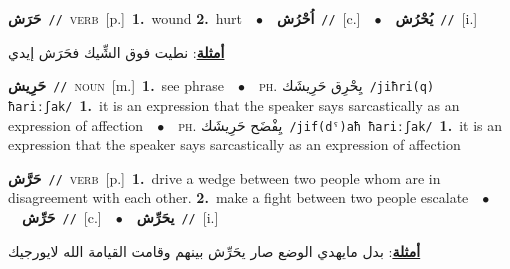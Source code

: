 \documentclass[10pt,a4paper,twoside]{article} %
\begin{document}
\begin{multicols}{2}
{\setlength\topsep{0pt}\textbf{\foreignlanguage{arabic}{حَرَش}}\ {\color{gray}\texttt{//}\color{black}}\ \textsc{verb}\ [p.]\ \textbf{1.}~wound  \textbf{2.}~hurt\ \ $\bullet$\ \ \setlength\topsep{0pt}\textbf{\foreignlanguage{arabic}{اُحْرُش}}\ {\color{gray}\texttt{//}\color{black}}\ [c.]\ \ $\bullet$\ \ \setlength\topsep{0pt}\textbf{\foreignlanguage{arabic}{يُحْرُش}}\ {\color{gray}\texttt{//}\color{black}}\ [i.]\  \begin{flushright}\color{gray}\foreignlanguage{arabic}{\textbf{\underline{\foreignlanguage{arabic}{أمثلة}}}: نطيت فوق الشِّيك فحَرَش إيدي}\end{flushright}\color{black}} \vspace{2mm}

{\setlength\topsep{0pt}\textbf{\foreignlanguage{arabic}{حَرِيش}}\ {\color{gray}\texttt{//}\color{black}}\ \textsc{noun}\ [m.]\ \textbf{1.}~see phrase\ \ $\bullet$\ \ \textsc{ph.} \color{gray} \foreignlanguage{arabic}{يِحْرِق حَرِيشَك}\color{black}\ {\color{gray}\texttt{/{\sffamily jiħri(q) ħariːʃak}/}\color{black}}\ \textbf{1.}~it is an expression that the speaker says sarcastically as an expression of affection\ \ $\bullet$\ \ \textsc{ph.} \color{gray} \foreignlanguage{arabic}{يِفْضَح حَرِيشَك}\color{black}\ {\color{gray}\texttt{/{\sffamily jif(dˤ)aħ ħariːʃak}/}\color{black}}\ \textbf{1.}~it is an expression that the speaker says sarcastically as an expression of affection\ } \vspace{2mm}

{\setlength\topsep{0pt}\textbf{\foreignlanguage{arabic}{حَرَّش}}\ {\color{gray}\texttt{//}\color{black}}\ \textsc{verb}\ [p.]\ \textbf{1.}~drive a wedge between two people whom are in disagreement with each other.  \textbf{2.}~make a fight between two people escalate\ \ $\bullet$\ \ \setlength\topsep{0pt}\textbf{\foreignlanguage{arabic}{حَرِّش}}\ {\color{gray}\texttt{//}\color{black}}\ [c.]\ \ $\bullet$\ \ \setlength\topsep{0pt}\textbf{\foreignlanguage{arabic}{يحَرِّش}}\ {\color{gray}\texttt{//}\color{black}}\ [i.]\  \begin{flushright}\color{gray}\foreignlanguage{arabic}{\textbf{\underline{\foreignlanguage{arabic}{أمثلة}}}: بدل مايهدي الوضع صار يحَرِّش بينهم وقامت القيامة الله لايورجيك}\end{flushright}\color{black}} \vspace{2mm}


\end{multicols}
\end{document}
